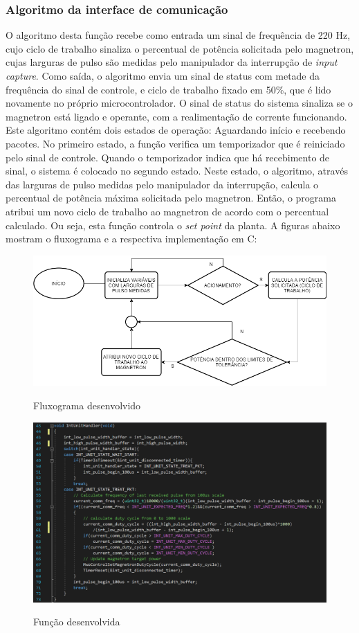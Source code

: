 \subsubsection{Algoritmo da interface de comunicação}
O algoritmo desta função recebe como entrada  um sinal de frequência de 220 Hz, cujo ciclo de trabalho sinaliza o percentual de potência solicitada pelo magnetron, cujas larguras de pulso são medidas pelo manipulador da interrupção de \textit{input capture}. Como saída, o algoritmo envia um sinal de status com metade da frequência do sinal de controle, e ciclo de trabalho fixado em 50\%, que é lido novamente no próprio microcontrolador. O sinal de status do sistema sinaliza se o magnetron está ligado e operante, com a realimentação de corrente funcionando. Este algoritmo contém dois estados de operação: Aguardando início e recebendo pacotes. No primeiro estado, a função verifica um temporizador que é reiniciado pelo sinal de controle. Quando o temporizador indica que há recebimento de sinal, o sistema é colocado no segundo estado. Neste estado, o algoritmo, através das larguras de pulso medidas pelo manipulador da interrupção, calcula o percentual de potência máxima solicitada pelo magnetron. Então, o programa atribui um novo ciclo de trabalho ao magnetron de acordo com o percentual calculado. Ou seja, esta função controla o \textit{set point} da planta. A figuras abaixo mostram o fluxograma e a respectiva implementação em C:
\begin{figure}[H]
    \centering
    \caption{Fluxograma desenvolvido}
    \includegraphics[width=1\textwidth]{./dados/figuras/flow_comm}
    \label{fig:figura-func_comm}
\end{figure}


\begin{figure}[H]
    \centering
    \caption{Função desenvolvida}
    \includegraphics[width=1\textwidth]{./dados/figuras/func_comm}
    \label{fig:figura-func_comm}
\end{figure}